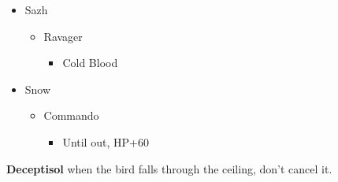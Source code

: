 \documentclass{report}
\begin{document}
\begin{menu}
\begin{itemize}
    \crystarium
    \begin{itemize}
        \item Sazh
        \begin{itemize}
            \item Ravager
            \begin{itemize}
                \item Cold Blood
            \end{itemize}
        \end{itemize}
        \item Snow
        \begin{itemize}
            \item Commando
            \begin{itemize}
                \item Until out, HP+60
            \end{itemize}
        \end{itemize}
    \end{itemize}
\end{itemize}
\end{menu}


\textbf{Deceptisol} when the bird falls through the ceiling, don't cancel it.
\end{document}

